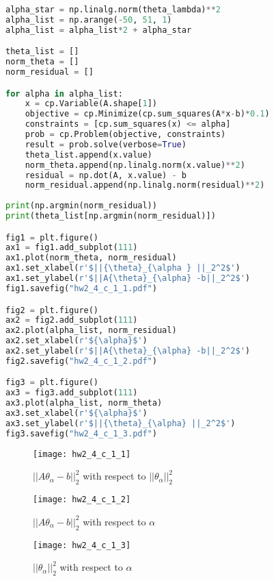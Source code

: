 \documentclass[11pt]{article}
\begin{document}
\begin{enumerate}[label=(\alph*)]
\begin{enumerate}[label=(\roman*)]
\begin{lstlisting}[language=Python, showstringspaces=false]
alpha_star = np.linalg.norm(theta_lambda)**2
alpha_list = np.arange(-50, 51, 1)
alpha_list = alpha_list*2 + alpha_star

theta_list = []
norm_theta = []
norm_residual = []

for alpha in alpha_list:
    x = cp.Variable(A.shape[1])
    objective = cp.Minimize(cp.sum_squares(A*x-b)*0.1)
    constraints = [cp.sum_squares(x) <= alpha]
    prob = cp.Problem(objective, constraints)
    result = prob.solve(verbose=True)
    theta_list.append(x.value)
    norm_theta.append(np.linalg.norm(x.value)**2)
    residual = np.dot(A, x.value) - b
    norm_residual.append(np.linalg.norm(residual)**2)
   
print(np.argmin(norm_residual))
print(theta_list[np.argmin(norm_residual)])

fig1 = plt.figure()
ax1 = fig1.add_subplot(111)
ax1.plot(norm_theta, norm_residual)
ax1.set_xlabel(r'$||{\theta}_{\alpha } ||_2^2$')
ax1.set_ylabel(r'$||A{\theta}_{\alpha} -b||_2^2$')
fig1.savefig("hw2_4_c_1_1.pdf")

fig2 = plt.figure()
ax2 = fig2.add_subplot(111)
ax2.plot(alpha_list, norm_residual)
ax2.set_xlabel(r'${\alpha}$')
ax2.set_ylabel(r'$||A{\theta}_{\alpha} -b||_2^2$')
fig2.savefig("hw2_4_c_1_2.pdf")

fig3 = plt.figure()
ax3 = fig3.add_subplot(111)
ax3.plot(alpha_list, norm_theta)
ax3.set_xlabel(r'${\alpha}$')
ax3.set_ylabel(r'$||{\theta}_{\alpha} ||_2^2$')
fig3.savefig("hw2_4_c_1_3.pdf")
\end{lstlisting}

\begin{figure}[H]
\centering
\texttt{[image: hw2\_4\_c\_1\_1]}
\caption{$||A{\theta}_\alpha -b||_2^2$ with respect to $||{\theta}_\alpha ||_2^2$}
\label{fig: hw2_4_c_1_1}
\end{figure}

\begin{figure}[H]
\centering
\texttt{[image: hw2\_4\_c\_1\_2]}
\caption{$||A{\theta}_\alpha -b||_2^2$ with respect to $\alpha$}
\label{fig: hw2_4_c_1_2}
\end{figure}

\begin{figure}[H]
\centering
\texttt{[image: hw2\_4\_c\_1\_3]}
\caption{$||{\theta}_\alpha ||_2^2$ with respect to $\alpha$}
\label{fig: hw2_4_c_1_3}
\end{figure}


\end{enumerate}
\end{enumerate}
\end{document}
